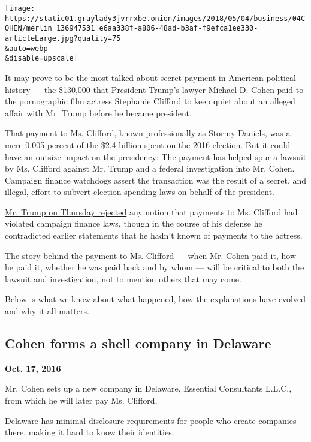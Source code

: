 \texttt{[image: https://static01.graylady3jvrrxbe.onion/images/2018/05/04/business/04COHEN/merlin\_136947531\_e6aa338f-a806-48ad-b3af-f9efca1ee330-articleLarge.jpg?quality=75\\\&auto=webp\\\&disable=upscale]}

It may prove to be the most-talked-about secret payment in American
political history --- the \$130,000 that President Trump's lawyer
Michael D. Cohen paid to the pornographic film actress Stephanie
Clifford to keep quiet about an alleged affair with Mr. Trump before he
became president.

That payment to Ms. Clifford, known professionally as Stormy Daniels,
was a mere 0.005 percent of the \$2.4 billion spent on the 2016
election. But it could have an outsize impact on the presidency: The
payment has helped spur a lawsuit by Ms. Clifford against Mr. Trump and
a federal investigation into Mr. Cohen. Campaign finance watchdogs
assert the transaction was the result of a secret, and illegal, effort
to subvert election spending laws on behalf of the president.

\href{https://www.nytimes3xbfgragh.onion/2018/05/03/us/politics/trump-cohen-giuliani.html?action=click\&module=Top\%20Stories\&pgtype=Homepage}{Mr.
Trump on Thursday rejected} any notion that payments to Ms. Clifford had
violated campaign finance laws, though in the course of his defense he
contradicted earlier statements that he hadn't known of payments to the
actress.

The story behind the payment to Ms. Clifford --- when Mr. Cohen paid it,
how he paid it, whether he was paid back and by whom --- will be
critical to both the lawsuit and investigation, not to mention others
that may come.

Below is what we know about what happened, how the explanations have
evolved and why it all matters.

\hypertarget{cohen-forms-a-shell-company-in-delaware}{%
\subsection{Cohen forms a shell company in
Delaware}\label{cohen-forms-a-shell-company-in-delaware}}

\textbf{Oct. 17, 2016}

Mr. Cohen sets up a new company in Delaware, Essential Consultants
L.L.C., from which he will later pay Ms. Clifford.

Delaware has minimal disclosure requirements for people who create
companies there, making it hard to know their identities.

